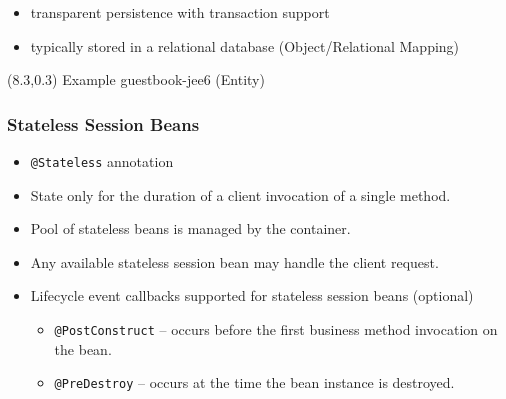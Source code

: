 \documentclass[10pt,xcolor=pdflatex]{beamer}
\begin{document}
\begin{frame}
\begin{itemize}
\begin{itemize}
        	\item transparent persistence with transaction support
        	\item typically stored in a relational database (Object/Relational Mapping) 
          \end{itemize}
	\end{itemize}
\begin{textblock}{15}(8.3,0.3)
    {\footnotesize Example guestbook-jee6 (Entity)}
\end{textblock}
\end{frame}


\begin{frame}\frametitle{Stateless Session Beans}
	\begin{itemize}
		\item \texttt{@Stateless} annotation
		\item State only for the duration of a client invocation of a single method.
        \item Pool of stateless beans is managed by the container.
		\item Any available stateless session bean may handle the client request.
		\item Lifecycle event callbacks supported for stateless session beans (optional)
          \begin{itemize}
        	\item \texttt{@PostConstruct} -- occurs before the first business method invocation on the bean.
        	\item \texttt{@PreDestroy} -- occurs at the time the bean instance is destroyed.
          \end{itemize}
	\end{itemize}
\end{frame}
\end{document}
